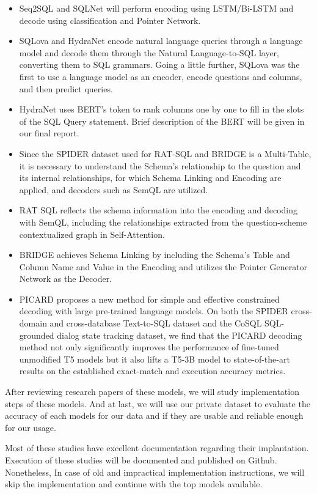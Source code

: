 \begin{itemize}
    \item Seq2SQL and SQLNet will perform encoding using LSTM/Bi-LSTM and decode using classification and Pointer Network.
    \item SQLova and HydraNet encode natural language queries through a language model and decode them through the Natural Language-to-SQL layer, converting them to SQL grammars. Going a little further, SQLova was the first to use a language model as an encoder, encode questions and columns, and then predict queries.
    \item HydraNet uses BERT's token to rank columns one by one to fill in the slots of the SQL Query statement. Brief description of the BERT will be given in our final report.
    \item Since the SPIDER dataset used for RAT-SQL and BRIDGE is a Multi-Table, it is necessary to understand the Schema's relationship to the question and its internal relationships, for which Schema Linking and Encoding are applied, and decoders such as SemQL are utilized.
    \item RAT SQL reflects the schema information into the encoding and decoding with SemQL, including the relationships extracted from the question-scheme contextualized graph in Self-Attention.
    \item BRIDGE achieves Schema Linking by including the Schema's Table and Column Name and Value in the Encoding and utilizes the Pointer Generator Network as the Decoder.
          \newpage
    \item PICARD proposes a new method for simple and effective constrained decoding with large pre-trained language models.
          On both the SPIDER cross-domain and cross-database Text-to-SQL dataset and the CoSQL SQL-grounded dialog state tracking dataset, we find that the PICARD decoding method not only significantly improves the performance of fine-tuned unmodified T5 models but it also lifts a T5-3B model to state-of-the-art results on the established exact-match and execution accuracy metrics.
\end{itemize}

After reviewing research papers of these models, we will study implementation steps of these models. And at last, we will use our private dataset to evaluate the accuracy of each models for our data and if they are usable and reliable enough for our usage.

Most of these studies have excellent documentation regarding their implantation. Execution of these studies will be documented and published on Github. Nonetheless, In case of old and impractical implementation instructions, we will skip the implementation and continue with the top models available.


